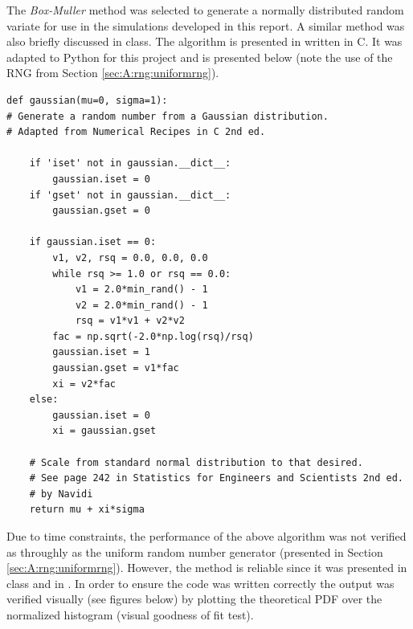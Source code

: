 \documentclass[paper=a4, fontsize=11pt]{scrartcl}
\numberwithin{equation}{section}		%
\numberwithin{figure}{section}			%
\numberwithin{table}{section}		    %
\begin{document}
\begin{appendices}
The \emph{Box-Muller} method \cite{press1996numerical} was selected to generate a normally 
distributed random variate for use in the simulations developed in this report. A similar method 
was also briefly discussed in class.  The algorithm is presented in \cite{press1996numerical} 
written in C. It was adapted to Python for this project and is presented below (note the use of the 
RNG from Section \ref{sec:A:rng:uniformrng}).\\

\begin{lstlisting}[frame=single, label=some-code, caption=Normal Random Number Generator]
def gaussian(mu=0, sigma=1):
# Generate a random number from a Gaussian distribution.
# Adapted from Numerical Recipes in C 2nd ed.

    if 'iset' not in gaussian.__dict__:
        gaussian.iset = 0
    if 'gset' not in gaussian.__dict__:
        gaussian.gset = 0

    if gaussian.iset == 0:
        v1, v2, rsq = 0.0, 0.0, 0.0
        while rsq >= 1.0 or rsq == 0.0:
            v1 = 2.0*min_rand() - 1
            v2 = 2.0*min_rand() - 1
            rsq = v1*v1 + v2*v2
        fac = np.sqrt(-2.0*np.log(rsq)/rsq)
        gaussian.iset = 1
        gaussian.gset = v1*fac
        xi = v2*fac
    else:
        gaussian.iset = 0
        xi = gaussian.gset
     
    # Scale from standard normal distribution to that desired.
    # See page 242 in Statistics for Engineers and Scientists 2nd ed. 
    # by Navidi
    return mu + xi*sigma
\end{lstlisting}
\vspace{4mm}

\noindent
Due to time constraints, the performance of the above algorithm was not verified as throughly as 
the uniform random number generator (presented in Section \ref{sec:A:rng:uniformrng}). However, the 
method is reliable since it was presented in class and in \cite{press1996numerical}. In order to 
ensure the code was written correctly the output was verified visually (see figures below) by 
plotting the theoretical PDF over the normalized histogram (visual goodness of fit test).


\end{appendices}
\end{document}

